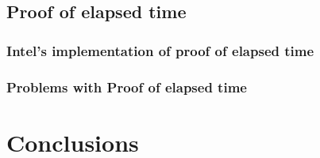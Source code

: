\documentclass{acm_proc_article-sp}
\begin{document}
\subsection{Proof of elapsed time}


\subsubsection{Intel's implementation of proof of elapsed time}


\subsubsection{Problems with Proof of elapsed time}


\section{Conclusions}


%




\end{document}

